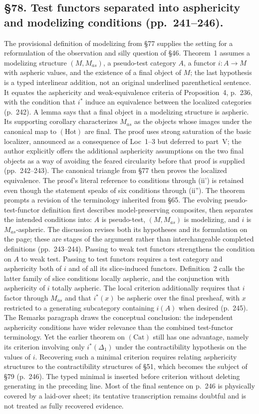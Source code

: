 \documentclass[10pt,oneside]{book}
\begin{document}
\subsection*{\S78. Test functors separated into asphericity and modelizing conditions (pp.\ 241--246).}
The provisional definition of modelizing from \S77 supplies the setting for a reformulation of the observation and silly question of \S46. Theorem~1 assumes a modelizing structure $(M,M_{as})$, a pseudo-test category $A$, a functor $i:A\to M$ with aspheric values, and the existence of a final object of $M$; the last hypothesis is a typed interlinear addition, not an original underlined parenthetical sentence. It equates the asphericity and weak-equivalence criteria of Proposition~4, p.\ 236, with the condition that $i^*$ induce an equivalence between the localized categories (p.\ 242). A lemma says that a final object in a modelizing structure is aspheric. Its supporting corollary characterizes $M_{as}$ as the objects whose images under the canonical map to $(\mathrm{Hot})$ are final. The proof uses strong saturation of the basic localizer, announced as a consequence of Loc~1--3 but deferred to part~V; the author explicitly offers the additional asphericity assumptions on the two final objects as a way of avoiding the feared circularity before that proof is supplied (pp.\ 242--243). The canonical triangle from \S77 then proves the localized equivalence. The proof's literal reference to conditions through (ii') is retained even though the statement speaks of six conditions through (ii'').
The theorem prompts a revision of the terminology inherited from \S65. The evolving pseudo-test-functor definition first describes model-preserving composites, then separates the intended conditions into: $A$ is pseudo-test, $(M,M_{as})$ is modelizing, and $i$ is $M_{as}$-aspheric. The discussion revises both its hypotheses and its formulation on the page; these are stages of the argument rather than interchangeable completed definitions (pp.\ 243--244). Passing to weak test functors strengthens the condition on $A$ to weak test. Passing to test functors requires a test category and asphericity both of $i$ and of all its slice-induced functors. Definition~2 calls the latter family of slice conditions locally aspheric, and the conjunction with asphericity of $i$ totally aspheric. The local criterion additionally requires that $i$ factor through $M_{as}$ and that $i^*(x)$ be aspheric over the final presheaf, with $x$ restricted to a generating subcategory containing $i(A)$ when desired (p.\ 245). The Remarks paragraph draws the conceptual conclusion: the independent asphericity conditions have wider relevance than the combined test-functor terminology. Yet the earlier theorem on $(\mathrm{Cat})$ still has one advantage, namely its criterion involving only $i^*(\Delta_1)$ under the contractibility hypothesis on the values of $i$. Recovering such a minimal criterion requires relating asphericity structures to the contractibility structures of \S51, which becomes the subject of \S79 (p.\ 246). The typed minimal is inserted before criterion without deleting generating in the preceding line. Most of the final sentence on p.\ 246 is physically covered by a laid-over sheet; its tentative transcription remains doubtful and is not treated as fully recovered evidence.
\end{document}
